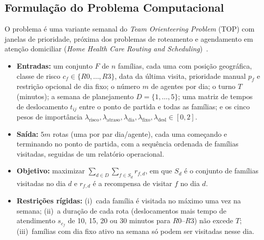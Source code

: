 \documentclass[11pt,a4paper]{article}
\begin{document}
\subsection{Formulação do Problema Computacional}

O problema é uma variante semanal do \emph{Team Orienteering Problem} (TOP) com janelas de prioridade, próxima dos problemas de roteamento e agendamento em atenção domiciliar (\emph{Home Health Care Routing and Scheduling})~\cite{cinar2021,mankowska2014}.

\begin{itemize}
    \item \textbf{Entradas:} um conjunto $F$ de $n$ famílias, cada uma com posição geográfica, classe de risco $c_f \in \{R0,\dots,R3\}$, data da última visita, prioridade manual $p_f$ e restrição opcional de dia fixo; o número $m$ de agentes por dia; o turno $T$ (minutos); a semana de planejamento $D=\{1,\dots,5\}$; uma matriz de tempos de deslocamento $t_{ij}$ entre o ponto de partida e todas as famílias; e os cinco pesos de importância $\lambda_{\text{risco}}, \lambda_{\text{atraso}}, \lambda_{\text{dia}}, \lambda_{\text{fixo}}, \lambda_{\text{desl}} \in [0,2]$.
    \item \textbf{Saída:} $5m$ rotas (uma por par dia/agente), cada uma começando e terminando no ponto de partida, com a sequência ordenada de famílias visitadas, seguidas de um relatório operacional.
    \item \textbf{Objetivo:} maximizar $\sum_{d \in D} \sum_{f \in S_d} r_{f,d}$, em que $S_d$ é o conjunto de famílias visitadas no dia $d$ e $r_{f,d}$ é a recompensa de visitar $f$ no dia $d$.
    \item \textbf{Restrições rígidas:} (i)~cada família é visitada no máximo uma vez na semana; (ii)~a duração de cada rota (deslocamentos mais tempo de atendimento $s_{c_f}$ de 10, 15, 20 ou 30 minutos para $R0$--$R3$) não excede $T$; (iii)~famílias com dia fixo ativo na semana só podem ser visitadas nesse dia.
\end{itemize}
\end{document}

